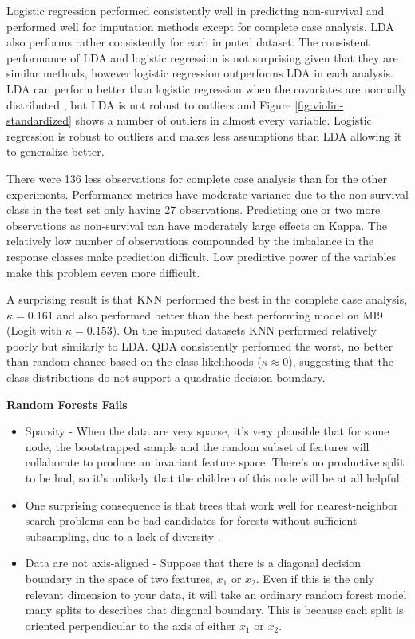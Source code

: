 \documentclass[12pt,]{article}
\begin{document}
Logistic regression performed consistently well in predicting
non-survival and performed well for imputation methods except for
complete case analysis. LDA also performs rather consistently for each
imputed dataset. The consistent performance of LDA and logistic
regression is not surprising given that they are similar methods,
however logistic regression outperforms LDA in each analysis. LDA can
perform better than logistic regression when the covariates are normally
distributed \autocite{efron_efficiency_1975}, but LDA is not robust to
outliers \autocite{hastie_elements_2009} and Figure
\ref{fig:violin-standardized} shows a number of outliers in almost every
variable. Logistic regression is robust to outliers and makes less
assumptions than LDA \autocite{hastie_elements_2009} allowing it to
generalize better.

There were 136 less observations for complete case analysis than for the
other experiments. Performance metrics have moderate variance due to the
non-survival class in the test set only having 27 observations.
Predicting one or two more observations as non-survival can have
moderately large effects on Kappa. The relatively low number of
observations compounded by the imbalance in the response classes make
prediction difficult. Low predictive power of the variables make this
problem eeven more difficult.

A surprising result is that KNN performed the best in the complete case
analysis, \(\kappa=0.161\) and also performed better than the best
performing model on MI9 (Logit with \(\kappa=0.153\)). On the imputed
datasets KNN performed relatively poorly but similarly to LDA. QDA
consistently performed the worst, no better than random chance based on
the class likelihoods (\(\kappa \approx 0\)), suggesting that the class
distributions do not support a quadratic decision boundary.

\textbf{Random Forests Fails}

\begin{itemize}
\item
  Sparsity - When the data are very sparse, it's very plausible that for
  some node, the bootstrapped sample and the random subset of features
  will collaborate to produce an invariant feature space. There's no
  productive split to be had, so it's unlikely that the children of this
  node will be at all helpful.
\item
  One surprising consequence is that trees that work well for
  nearest-neighbor search problems can be bad candidates for forests
  without sufficient subsampling, due to a lack of diversity
  \autocite{tang_when_2018}.
\item
  Data are not axis-aligned - Suppose that there is a diagonal decision
  boundary in the space of two features, \(x_1\) or \(x_2\). Even if
  this is the only relevant dimension to your data, it will take an
  ordinary random forest model many splits to describes that diagonal
  boundary. This is because each split is oriented perpendicular to the
  axis of either \(x_1\) or \(x_2\).
\end{itemize}
\end{document}
